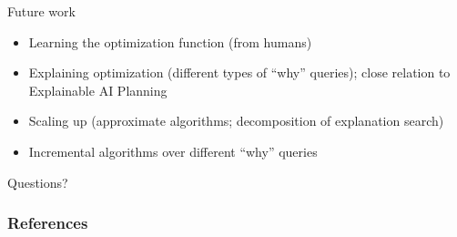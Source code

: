 \documentclass{beamer}
\renewcommand\emph[1]{{\color{vuborange}#1}}
\begin{document}
	\begin{frame}{Future work}

\begin{itemize}
	\item Learning the optimization function (from humans)
	\item Explaining optimization (different types of ``why'' queries); close relation to Explainable AI Planning \cite{fox2017explainable}
	\item Scaling up (approximate algorithms; decomposition of explanation search)
	\item Incremental algorithms over different ``why'' queries
\end{itemize}	
	
	
\end{frame}


	\begin{frame}
		\begin{center}
			{\huge Questions?}
		\end{center}

		
		
	\end{frame}

	
	\begin{frame}[allowframebreaks]
		\frametitle{References}
		
		
	\end{frame}
	

	
\end{document}
